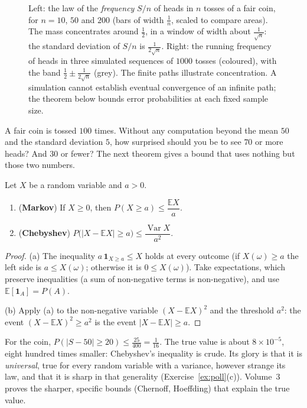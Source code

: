 \begin{figure}[ht]
\centering
{}
\caption{Left: the law of the \emph{frequency} $S/n$ of heads in $n$ tosses of a fair coin, for $n=10$, $50$ and $200$ (bars of width $\frac1n$, scaled to compare areas). The mass concentrates around $\frac12$, in a window of width about $\frac1{\sqrt n}$: the standard deviation of $S/n$ is $\frac1{2\sqrt n}$. Right: the running frequency of heads in three simulated sequences of $1000$ tosses (coloured), with the band $\frac12\pm\frac1{2\sqrt n}$ (grey). The finite paths illustrate concentration. A simulation cannot establish eventual convergence of an infinite path; the theorem below bounds error probabilities at each fixed sample size.}
\label{fig:binomial}
\end{figure}

\begin{think}
A fair coin is tossed $100$ times. Without any computation beyond the mean $50$ and the standard deviation $5$, how surprised should you be to see $70$ or more heads? And $30$ or fewer? The next theorem gives a bound that uses nothing but those two numbers.
\end{think}

\begin{theorem}\label{thm:chebyshev}
Let $X$ be a random variable and $a>0$.
\begin{enumerate}[label=(\alph*)]
\item (\textbf{Markov}) If $X\ge0$, then $P(X\ge a)\le\dfrac{\mathbb E X}a$.
\item (\textbf{Chebyshev}) $P\big(|X-\mathbb EX|\ge a\big)\le\dfrac{\operatorname{Var}X}{a^2}$.
\end{enumerate}
\end{theorem}
\begin{proof}
(a) The inequality $a\,\mathbf 1_{X\ge a}\le X$ holds at every outcome (if $X(\omega)\ge a$ the left side is $a\le X(\omega)$; otherwise it is $0\le X(\omega)$). Take expectations, which preserve inequalities (a sum of non-negative terms is non-negative), and use $\mathbb E[\mathbf 1_A]=P(A)$.

(b) Apply (a) to the non-negative variable $(X-\mathbb EX)^2$ and the threshold $a^2$: the event $(X-\mathbb EX)^2\ge a^2$ is the event $|X-\mathbb EX|\ge a$.
\end{proof}

For the coin, $P(|S-50|\ge20)\le\frac{25}{400}=\frac1{16}$. The true value is about $8\times10^{-5}$, eight hundred times smaller: Chebyshev's inequality is crude. Its glory is that it is \emph{universal}, true for every random variable with a variance, however strange its law, and that it is sharp in that generality (Exercise~\ref{ex:poll}(c)). Volume~3 proves the sharper, specific bounds (Chernoff, Hoeffding) that explain the true value.

